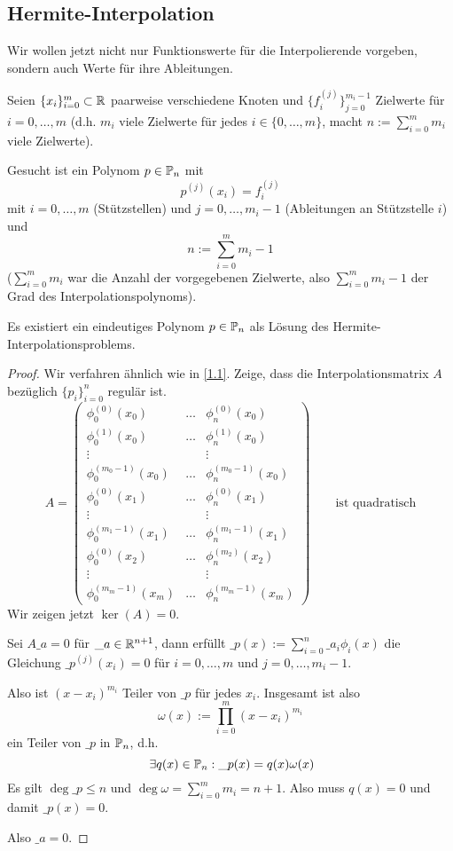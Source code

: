 \documentclass[
]{mycourse}
\begin{document}
\subsection{Hermite-Interpolation}

Wir wollen jetzt nicht nur Funktionswerte für die Interpolierende vorgeben, sondern auch Werte für ihre Ableitungen.

Seien $\{x_i\}_{i=0}^m \subset \R$ paarweise verschiedene Knoten und $\{f_i^{(j)}\}_{j=0}^{m_i-1}$ Zielwerte für $i=0,\dotsc, m$ (d.h. $m_i$ viele Zielwerte für jedes $i \in \{0,\dotsc, m\}$, macht $n := \sum_{i=0}^m m_i$ viele Zielwerte).

Gesucht ist ein Polynom $p\in \P_n$ mit 
\[
	p^{(j)}(x_i) =f_i^{(j)}
\]
mit $i=0,\dotsc,m$ (Stützstellen) und $j=0,\dotsc,m_i-1$ (Ableitungen an Stützstelle $i$) und 
\[
	n := \sum_{i=0}^m m_i - 1
\]
($\sum_{i=0}^m m_i$ war die Anzahl der vorgegebenen Zielwerte, also $\sum_{i=0}^m m_i -1$ der Grad des Interpolationspolynoms).

\begin{st}
	\label{1.19}
	Es existiert ein eindeutiges Polynom $p\in \P_n$ als Lösung des Hermite-Interpolationsproblems.
	\begin{proof}
		Wir verfahren ähnlich wie in \ref{1.1}.
		Zeige, dass die Interpolationsmatrix $A$ bezüglich $\{p_i\}_{i=0}^n$ regulär ist.
		\[
			A= \begin{pmatrix}
				\phi_0^{(0)}(x_0) &\hdots &\phi_n^{(0)}(x_0)\\
				\phi_0^{(1)}(x_0) &\hdots &\phi_n^{(1)}(x_0)\\
				\vdots &  & \vdots \\
				\phi_0^{(m_0-1)}(x_0)& \hdots &\phi_n^{(m_0-1)}(x_0)\\
				\phi_0^{(0)}(x_1) &\hdots &\phi_n^{(0)}(x_1)\\
				\vdots& & \vdots \\
				\phi_0^{(m_1-1)}(x_1)& \hdots &\phi_n^{(m_1-1)}(x_1)\\
				\phi_0^{(0)}(x_2) &\hdots &\phi_n^{(m_2)}(x_2)\\
				\vdots& & \vdots \\
				\phi_0^{(m_m-1)}(x_m) &\hdots &\phi_n^{(m_m-1)}(x_m)
			\end{pmatrix}
			\qquad \text{ist quadratisch}
		\]
		Wir zeigen jetzt $\ker(A) = 0$.

		Sei $A\_a = 0$ für $\_a\in \R^{n+1}$, dann erfüllt $\_p(x) := \sum_{i=0}^n \_a_i \phi_i(x)$ die Gleichung $\_p^{(j)}(x_i) = 0$ für $i=0,\dotsc,m$ und $j=0,\dotsc,m_i-1$.
		
		Also ist $(x-x_i)^{m_i}$ Teiler von $\_p$ für jedes $x_i$.
		Insgesamt ist also
		\[
			\omega(x) := \prod_{i=0}^m (x-x_i)^{m_i}
		\]
		ein Teiler von $\_p$ in $\P_n$, d.h.
		\[
			\exists q(x)\in \P_n : \_p(x) = q(x) \omega(x)
		\]
		Es gilt $\deg \_p \le n$ und $\deg \omega = \sum_{i=0}^m m_i = n+1$.
		Also muss $q(x)=0$ und damit $\_p(x) = 0$.

		Also $\_a=0$.
	\end{proof}
\end{st}
\end{document}
